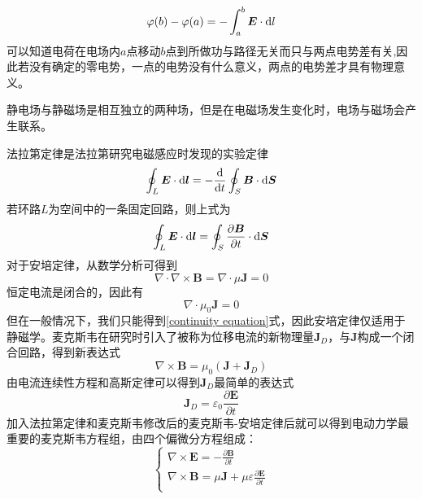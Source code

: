 \documentclass[UTF8,a4paper,10pt]{ctexart}
\begin{document}
\begin{multicols}{2}
        \begin{equation}
            \varphi(b) - \varphi(a) = -\int_a^b\bm{E}\cdot{\rm d}l
        \end{equation}
        可以知道电荷在电场内$a$点移动$b$点到所做功与路径无关而只与两点电势差有关,因此若没有确定的零电势，一点的电势没有什么意义，两点的电势差才具有物理意义。\par
        静电场与静磁场是相互独立的两种场，但是在电磁场发生变化时，电场与磁场会产生联系。\par
        法拉第定律是法拉第研究电磁感应时发现的实验定律
        \begin{equation}
            \oint_L\bm{E}\cdot{\rm d}\bm{l} = -\frac{{\rm d}}{{\rm d}t}\oint_S\bm{B}\cdot{\rm d}\bm{S}
        \end{equation}
        若环路$L$为空间中的一条固定回路，则上式为
        \begin{equation}
            \oint_L\bm{E}\cdot{\rm d}\bm{l} = \oint_S\frac{\partial\bm{B}}{\partial t}\cdot{\rm d}\bm{S}
        \end{equation}
        对于安培定律，从数学分析可得到
        \begin{equation}
            \nabla\cdot\nabla\times\bm{B} = \nabla\cdot\mu\bm{J} = 0
        \end{equation}
        恒定电流是闭合的，因此有
        \begin{equation}
            \nabla\cdot\mu_0\bm{J} = 0
        \end{equation}
        但在一般情况下，我们只能得到\eqref{continuity equation}式，因此安培定律仅适用于静磁学。麦克斯韦在研究时引入了被称为位移电流的新物理量$\bm{J}_D$，与$\bm{J}$构成一个闭合回路，得到新表达式
        \begin{equation}
            \nabla\times\bm{B} = \mu_0(\bm{J}+\bm{J}_D)
        \end{equation}
        由电流连续性方程和高斯定律可以得到$\bm{J}_D$最简单的表达式
        \begin{equation}
            \bm{J}_D = \varepsilon_0\frac{\partial\bm{E}}{\partial t}
        \end{equation}
        加入法拉第定律和麦克斯韦修改后的麦克斯韦-安培定律后就可以得到电动力学最重要的麦克斯韦方程组，由四个偏微分方程组成：
        \begin{equation}\label{Maxwell's equations}
            \left\{\begin{array}{l}
                \nabla\times\bm{E} = -\frac{\partial\bm{B}}{\partial t}\\
                \nabla\times\bm{B} = \mu\bm{J}+\mu\varepsilon\frac{\partial\bm{E}}{\partial t}\\

\end{array}
\end{equation}
\end{multicols}
\end{document}

